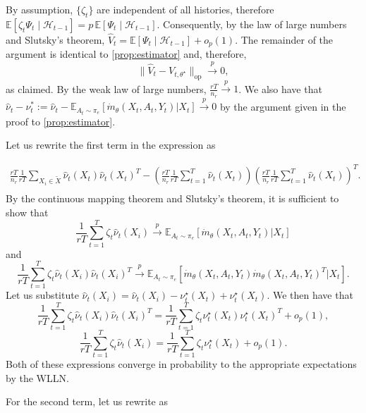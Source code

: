 \documentclass[11pt]{article}
\newcommand{\E}{\mathbb{E}}
\begin{document}
\begin{appendix}
By assumption, $\{\zeta_t\}$ are independent of all histories, therefore $
\E[\zeta_t\Psi_t \mid \mathcal H_{t-1}]
=
p\,\E[\Psi_t \mid \mathcal H_{t-1}]$. 
Consequently, by the law of large numbers and Slutsky’s theorem,
$
\widehat V_t
=
\E[\Psi_t \mid \mathcal H_{t-1}]
+ o_p(1).
$
The remainder of the argument is identical to \cref{prop:estimator} and, therefore,
\[
\big\|\widehat V_t - V_{t,\theta^\star}\big\|_{\mathrm{op}}
\xrightarrow{p} 0,
\]
as claimed.
\iffalse
By the weak law of large numbers, $\frac{rT}{n_{r}} \overset{p}{\to} 1$. We also have that $\hat{\nu}_{t} - \nu_t^* := \hat{\nu}_{t} - \E_{A_{t} \sim \pi_{e}} \left[ \dot{m}_{\theta}(X_t,A_t,Y_t) |X_{t} \right]\overset{p}{\to} 0$ by the argument given in the proof to \cref{prop:estimator}. 

Let us rewrite the first term in the expression as 

\begin{align*}
 \frac{rT}{n_r} \frac{1}{rT}\sum_{X_{i} \in \tilde{X}} \hat{\nu}_{t}(X_t)\hat{\nu}_{t}(X_t)^{T} - \left( \frac{rT}{n_r} \frac{1}{rT} \sum_{t=1}^{T} \hat{\nu}_{t}(X_t) \right) \left(\frac{rT}{n_r} \frac{1}{rT} \sum_{t=1}^{T} \hat{\nu}_{t}(X_t) \right)^{T}.\\
\end{align*}
By the continuous mapping theorem and Slutsky's theorem, it is sufficient to show that 
$$\frac{1}{rT} \sum_{t=1}^{T} \zeta_t\hat{\nu}_{t}(X_i) \overset{p}{\to} \E_{A_{t} \sim \pi_{e}} \left[ \dot{m}_{\theta}(X_t,A_t,Y_t) |X_{t} \right]$$
and
$$\frac{1}{rT} \sum_{t=1}^{T} \zeta_t\hat{\nu}_{t}(X_i) \hat{\nu}_{t}(X_i) ^{T}\overset{p}{\to} \E_{A_{t} \sim \pi_{e}} \left[ \dot{m}_{\theta}(X_t,A_t,Y_t)\dot{m}_{\theta}(X_t,A_t,Y_t)^{T} |X_{t} \right].$$
Let us substitute $\hat{\nu}_{t}(X_i) = \hat{\nu}_{t}(X_i) - \nu^{\star}_{t}(X_t) + \nu^{\star}_{t}(X_t)$. We then have that 
$$\frac{1}{rT} \sum_{t=1}^{T} \zeta_t\hat{\nu}_{t}(X_i) \hat{\nu}_{t}(X_i) ^{T} =\frac{1}{rT} \sum_{t=1}^{T} \zeta_t \nu^{\star}_{t}(X_t) \nu^{\star}_{t}(X_t)^{T} +o_{p}(1),$$
$$\frac{1}{rT} \sum_{t=1}^{T} \zeta_t\hat{\nu}_{t}(X_i) =\frac{1}{rT} \sum_{t=1}^{T} \zeta_t \nu^{\star}_{t}(X_t) +o_{p}(1).$$
Both of these expressions converge in probability to the appropriate expectations by the WLLN. 

For the second term, let us rewrite as 


\end{appendix}
\end{document}

